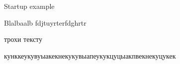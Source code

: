 \documentclass{lib/styles/default-style}
\begin{document}
\pagestyle{default-numbered}
Startup example
\startStartupSection

Blalbaalb
\startStartupSection
fdjtuyrterfdghrtr

трохи тексту

кунккеукувуыакекнекукувыапеукукцуцыакпвекнекуцукек
\startStartupSection
\startStartupSection
\startStartupSection
\end{document}
